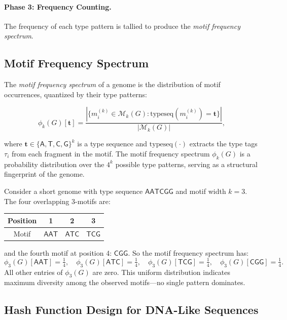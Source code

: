 \paragraph{Phase 3: Frequency Counting.} The frequency of each type pattern is tallied to produce the \emph{motif frequency spectrum}.

\subsection{Motif Frequency Spectrum}

The \emph{motif frequency spectrum} of a genome is the distribution of motif occurrences, quantized by their type patterns:

\begin{equation}
\phi_k(G)[\mathbf{t}] = \frac{|\{m_i^{(k)} \in \mathcal{M}_k(G) : \mathrm{typeseq}(m_i^{(k)}) = \mathbf{t}\}|}{|\mathcal{M}_k(G)|},
\label{eq:motif-spectrum}
\end{equation}

where $\mathbf{t} \in \{\mathsf{A}, \mathsf{T}, \mathsf{C}, \mathsf{G}\}^k$ is a type sequence and $\mathrm{typeseq}(\cdot)$ extracts the type tags $\tau_i$ from each fragment in the motif. The motif frequency spectrum $\phi_k(G)$ is a probability distribution over the $4^k$ possible type patterns, serving as a structural fingerprint of the genome.

\begin{example}
\label{ex:motif-spectrum}
Consider a short genome with type sequence $\mathsf{AATCGG}$ and motif width $k = 3$. The four overlapping 3-motifs are:
\begin{center}
\begin{tabular}{cccc}
Position & 1 & 2 & 3 \\
\midrule
Motif & $\mathsf{AAT}$ & $\mathsf{ATC}$ & $\mathsf{TCG}$ \\
\end{tabular}
\end{center}
and the fourth motif at position 4: $\mathsf{CGG}$. So the motif frequency spectrum has:
\[
\phi_3(G)[\mathsf{AAT}] = \tfrac{1}{4}, \quad
\phi_3(G)[\mathsf{ATC}] = \tfrac{1}{4}, \quad
\phi_3(G)[\mathsf{TCG}] = \tfrac{1}{4}, \quad
\phi_3(G)[\mathsf{CGG}] = \tfrac{1}{4}.
\]
All other entries of $\phi_3(G)$ are zero. This uniform distribution indicates maximum diversity among the observed motifs---no single pattern dominates.
\end{example}

\subsection{Hash Function Design for DNA-Like Sequences}
\label{subsec:hash-design}

